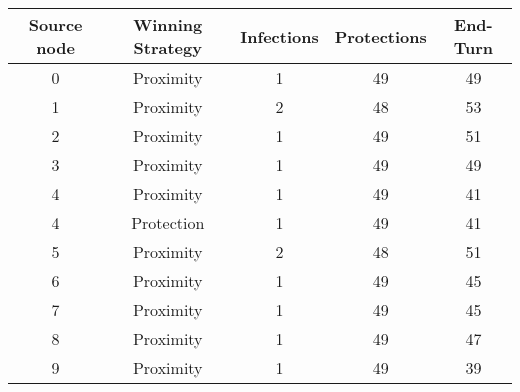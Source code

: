 \documentclass[results.tex]{subfiles}
\begin{document}
    \begin{center}
        \begin{tabular}{| c || c | c | c | c |}
            \hline
            {\bfseries Source node} & {\bfseries Winning Strategy} & {\bfseries Infections} & {\bfseries Protections}
            & {\bfseries End-Turn}
            \\  %
            \hline\hline
            0                       & Proximity                    & 1                      & 49                      & 49                   \\
            \hline
            1                       & Proximity                    & 2                      & 48                      & 53                   \\
            \hline
            2                       & Proximity                    & 1                      & 49                      & 51                   \\
            \hline
            3                       & Proximity                    & 1                      & 49                      & 49                   \\
            \hline
            4                       & Proximity                    & 1                      & 49                      & 41                   \\
            \hline
            4                       & Protection                   & 1                      & 49                      & 41                   \\
            \hline
            5                       & Proximity                    & 2                      & 48                      & 51                   \\
            \hline
            6                       & Proximity                    & 1                      & 49                      & 45                   \\
            \hline
            7                       & Proximity                    & 1                      & 49                      & 45                   \\
            \hline
            8                       & Proximity                    & 1                      & 49                      & 47                   \\
            \hline
            9                       & Proximity                    & 1                      & 49                      & 39                   \\

\end{tabular}
\end{center}
\end{document}
